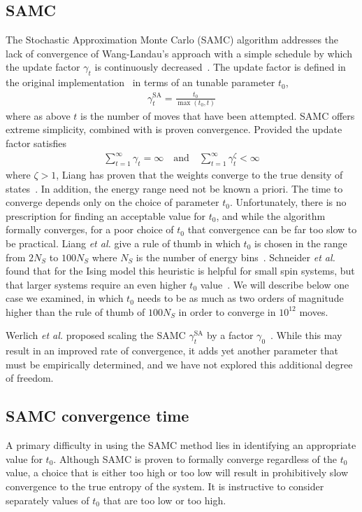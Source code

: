 \documentclass[letterpaper,twocolumn,amsmath,amssymb,pre,aps,10pt]{revtex4-1}
\begin{document}
\subsection{SAMC}
The Stochastic Approximation Monte Carlo (SAMC) algorithm addresses the lack of
convergence of Wang-Landau's approach with a simple schedule by which the update
factor $\gamma_t$ is continuously decreased~\cite{liang2007stochastic,
werlich2015stochastic, schneider2017convergence}.  The update factor is defined
in the original implementation~\cite{liang2007stochastic} in terms of an tunable
parameter $t_0$,
\begin{align}
\gamma_{t}^{\text{SA}} =\frac{t_0}{\max(t_0,t)}\label{eq:1}
\end{align}
where as above $t$ is the number of moves that have been attempted.
SAMC offers extreme simplicity, combined with is proven convergence.
Provided the update factor satisfies
\begin{align}
\sum_{t=1}^\infty \gamma_{t} = \infty \quad\textrm{and}\quad
\sum_{t=1}^\infty \gamma_{t}^\zeta < \infty
\end{align}
where $\zeta > 1$, Liang has proven that the weights converge to the true
density of states~\cite{liang2006theory, liang2007stochastic,
liang2009improving}.  In addition, the energy range need not be known a priori.
The time to converge depends only on the choice of parameter $t_0$.
Unfortunately, there is no prescription for finding an acceptable value for
$t_0$, and while the algorithm formally converges, for a poor choice of $t_0$
that convergence can be far too slow to be practical. Liang \emph{et al.} give a
rule of thumb in which $t_0$ is chosen in the range from $2N_S$ to $100N_S$
where $N_S$ is the number of energy bins~\cite{liang2007stochastic}. Schneider
\emph{et al.} found that for the Ising model this heuristic is helpful for small
spin systems, but that larger systems require an even higher $t_0$
value~\cite{schneider2017convergence}.  We will describe below one case we
examined, in which $t_0$ needs to be as much as two orders of magnitude higher
than the rule of thumb of $100N_S$ in order to converge in $10^{12}$ moves.

Werlich \emph{et al.} proposed scaling the SAMC $\gamma_t^{\text{SA}}$
by a factor $\gamma_0$~\cite{werlich2015stochastic}.  While this may result in
an improved rate of convergence, it adds yet another parameter that must be
empirically determined, and we have not explored this additional degree of
freedom.

\subsection{SAMC convergence time}\label{sec:samc-convergence}
A primary difficulty in using the SAMC method lies in identifying an
appropriate value for $t_0$.  Although SAMC is proven to formally
converge regardless of the $t_0$ value, a choice that is either too
high or too low will result in prohibitively slow convergence to the true
entropy of the system.  It is instructive to consider separately
values of $t_0$ that are too low or too high.
\end{document}
